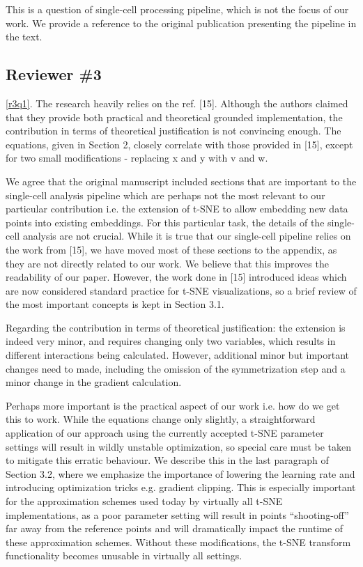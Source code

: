 \documentclass{article}
\newcounter{rtaskno}
\newcommand{\rtask}[1]{\refstepcounter{rtaskno}\label{#1}}
\newcommand{\reviewc}[2]{\begin{leftbar}\noindent\rtask{#1}\ref{#1}. #2\end{leftbar}}
\newcommand{\answer}[1]{\noindent #1\\[0mm]}
\newlength{\leftbarwidth}
\newlength{\leftbarsep}
\renewenvironment{leftbar}{%
    \def\FrameCommand{{\color{black}{\vrule width \leftbarwidth\relax\hspace {\leftbarsep}}}}%
    \MakeFramed {\advance \hsize -\width \FrameRestore }%
}{\endMakeFramed}
\begin{document}
\answer{
	This is a question of single-cell processing pipeline, which is not the focus of our work. We provide a reference to the original publication presenting the pipeline in the text.
}


\subsection*{Reviewer \#3}

\reviewc{r3q1}{The research heavily relies on the ref. [15]. Although the authors claimed that they provide both practical and theoretical grounded implementation, the contribution in terms of theoretical justification is not convincing enough. The equations, given in Section 2, closely correlate with those provided in [15], except for two small modifications - replacing x and y with v and w. }

\answer{
	We agree that the original manuscript included sections that are important to the single-cell analysis pipeline which are perhaps not the most relevant to our particular contribution i.e. the extension of t-SNE to allow embedding new data points into existing embeddings. For this particular task, the details of the single-cell analysis are not crucial. While it is true that our single-cell pipeline relies on the work from [15], we have moved most of these sections to the appendix, as they are not directly related to our work. We believe that this improves the readability of our paper. However, the work done in [15] introduced ideas which are now considered standard practice for t-SNE visualizations, so a brief review of the most important concepts is kept in Section 3.1.

	Regarding the contribution in terms of theoretical justification: the extension is indeed very minor, and requires changing only two variables, which results in different interactions being calculated. However, additional minor but important changes need to made, including the omission of the symmetrization step and a minor change in the gradient calculation.

	Perhaps more important is the practical aspect of our work i.e. how do we get this to work. While the equations change only slightly, a straightforward application of our approach using the currently accepted t-SNE parameter settings will result in wildly unstable optimization, so special care must be taken to mitigate this erratic behaviour. We describe this in the last paragraph of Section 3.2, where we emphasize the importance of lowering the learning rate and introducing optimization tricks e.g. gradient clipping. This is especially important for the approximation schemes used today by virtually all t-SNE implementations, as a poor parameter setting will result in points ``shooting-off'' far away from the reference points and will dramatically impact the runtime of these approximation schemes. Without these modifications, the t-SNE transform functionality becomes unusable in virtually all settings.
}
\end{document}
